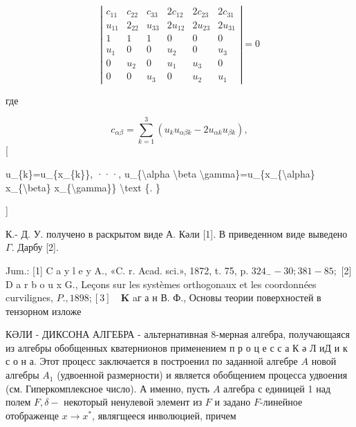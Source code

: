 \documentclass[10pt]{article}
\begin{document}
\[

\left|\begin{array}{llllll}

c_{11} & c_{22} & c_{33} & 2 c_{12} & 2 c_{23} & 2 c_{31} \\

u_{11} & 2_{22} & u_{33} & 2 u_{12} & 2 u_{23} & 2 u_{31} \\

1 & 1 & 1 & 0 & 0 & 0 \\

u_{1} & 0 & 0 & u_{2} & 0 & u_{3} \\

0 & u_{2} & 0 & u_{1} & u_{3} & 0 \\

0 & 0 & u_{3} & 0 & u_{2} & u_{1}

\end{array}\right|=0

\]



где



\[

c_{\alpha \beta}=\sum_{k=1}^{3}\left(u_{k} u_{\alpha \beta k}-2 u_{\alpha k} u_{\beta k}\right),

\][



u\_\{k\}=u\_\{x\_\{k\}\}, ···, u\_\{\textbackslash alpha \textbackslash beta \textbackslash gamma\}=u\_\{x\_\{\textbackslash alpha\} x\_\{\textbackslash beta\} x\_\{\textbackslash gamma\}\} \textbackslash text \{. \}

]



К.- Д. У. получено в раскрытом виде А. Кәли [1]. В приведенном виде выведено $\Gamma$. Дарбу [2].



Jum.: [1] C a y l e y A., «C. r. Acad. sci.», 1872, t. 75, p. $324_{-}-30 ; 381-85 ;$ [2] D a r b o u x G., Leçons sur les systèmes orthogonaux et les coordonnées curvilignes, $P ., 1898 ;[3] \quad \mathbf{K}$ aг а н В. Ф., Основы теории поверхностей в тензорном изложе



КӘЛИ - ДИКСОНА АЛГЕБРА - альтернативная 8-мерная алгебра, получающаяся из алгебры обобщенных кватернионов применением п р о ц е с с а К ә Л иД и к с о н а. Этот процесс заключается в построенил по заданной алгебре $A$ новой алгебры $A_{1}$ (удвоенной размерности) и является обобщением процесса удвоения (см. Гиперкомплексное число). А именно, пусть $A$ алгебра с единицей 1 над полем $F, \delta-$ некоторый ненулевой элемент из $F$ и задано $F$-линейное отображенце $x \rightarrow x^{*}$, являгщееся инволюцией, причем
\end{document}
